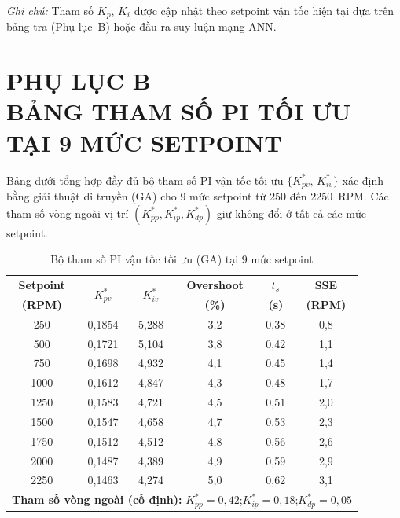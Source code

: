 \begingroup
\fontsize{13pt}{15.6pt}\selectfont
\noindent\textit{Ghi chú:} Tham số $K_p$, $K_i$ được cập nhật theo setpoint vận tốc
hiện tại dựa trên bảng tra (Phụ lục~B) hoặc đầu ra suy luận mạng ANN.
\endgroup


\chapter*{PHỤ LỤC B\\[0.4em]BẢNG THAM SỐ PI TỐI ƯU TẠI 9 MỨC SETPOINT}
\label{app:pi_table}

\begingroup
{}
\fontsize{13pt}{15.6pt}\selectfont
\setlength{\parskip}{6pt}

Bảng dưới tổng hợp đầy đủ bộ tham số PI vận tốc tối ưu
$\{K_{pv}^*,\,K_{iv}^*\}$ xác định bằng giải thuật di truyền (GA)
cho 9 mức setpoint từ 250 đến 2250~RPM.
Các tham số vòng ngoài vị trí $(K_{pp}^*, K_{ip}^*, K_{dp}^*)$ giữ
không đổi ở tất cả các mức setpoint.

\begin{table}[H]
\centering
\caption{Bộ tham số PI vận tốc tối ưu (GA) tại 9 mức setpoint}
\label{tab:pi_optimal_full}
\renewcommand{\arraystretch}{1.35}
\begin{tabular}{cccccc}
\toprule
\textbf{Setpoint} & \multirow{2}{*}{$K_{pv}^*$} & \multirow{2}{*}{$K_{iv}^*$}
    & \textbf{Overshoot} & \textbf{$t_s$} & \textbf{SSE} \\
\textbf{(RPM)} & & & \textbf{(\%)} & \textbf{(s)} & \textbf{(RPM)} \\
\midrule
250  & 0{,}1854 & 5{,}288 & 3{,}2 & 0{,}38 & 0{,}8 \\
500  & 0{,}1721 & 5{,}104 & 3{,}8 & 0{,}42 & 1{,}1 \\
750  & 0{,}1698 & 4{,}932 & 4{,}1 & 0{,}45 & 1{,}4 \\
1000 & 0{,}1612 & 4{,}847 & 4{,}3 & 0{,}48 & 1{,}7 \\
1250 & 0{,}1583 & 4{,}721 & 4{,}5 & 0{,}51 & 2{,}0 \\
1500 & 0{,}1547 & 4{,}658 & 4{,}7 & 0{,}53 & 2{,}3 \\
1750 & 0{,}1512 & 4{,}512 & 4{,}8 & 0{,}56 & 2{,}6 \\
2000 & 0{,}1487 & 4{,}389 & 4{,}9 & 0{,}59 & 2{,}9 \\
2250 & 0{,}1463 & 4{,}274 & 5{,}0 & 0{,}62 & 3{,}1 \\
\midrule
\multicolumn{6}{l}{%
  \textbf{Tham số vòng ngoài (cố định):}
  $K_{pp}^* = 0{,}42$;\quad $K_{ip}^* = 0{,}18$;\quad $K_{dp}^* = 0{,}05$%
} \\
\bottomrule
\end{tabular}
\end{table}

